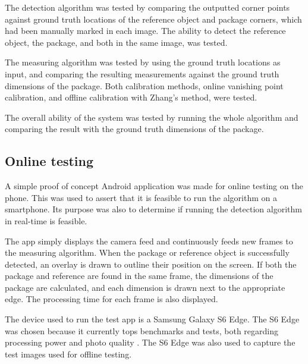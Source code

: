 The detection algorithm was tested by comparing the outputted corner points against ground truth locations of the reference object and package corners, which had been manually marked in each image.
The ability to detect the reference object, the package, and both in the same image, was tested.

The measuring algorithm was tested by using the ground truth locations as input, and comparing the resulting measurements against the ground truth dimensions of the package.
Both calibration methods, online vanishing point calibration, and offline calibration with Zhang's method, were tested. %

The overall ability of the system was tested by running the whole algorithm and comparing the result with the ground truth dimensions of the package. 


\subsection{Online testing} \label{method:online_testing}
A simple proof of concept Android application was made for online testing on the phone.
This was used to assert that it is feasible to run the algorithm on a smartphone.
Its purpose was also to determine if running the detection algorithm in real-time is feasible.

The app simply displays the camera feed and continuously feeds new frames to the measuring algorithm.
When the package or reference object is successfully detected, an overlay is drawn to outline their position on the screen.
If both the package and reference are found in the same frame, the dimensions of the package are calculated, and each dimension is drawn next to the appropriate edge.
The processing time for each frame is also displayed.

The device used to run the test app is a Samsung Galaxy S6 Edge.
The S6 Edge was chosen because it currently tops benchmarks and tests, both regarding processing power and photo quality \cite{phone_performance_benchmark}\cite{phone_camera_benchmark}.
The S6 Edge was also used to capture the test images used for offline testing.










